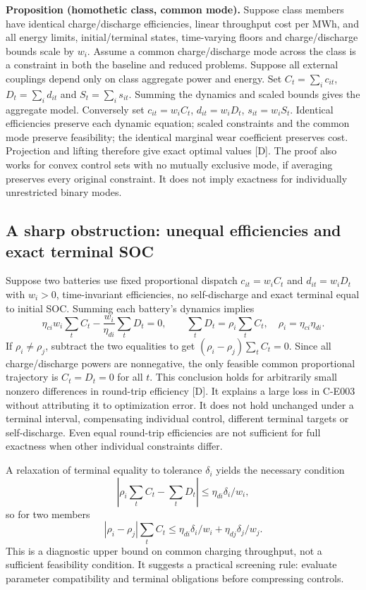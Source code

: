 \documentclass[11pt,letterpaper]{article}
\begin{document}
\textbf{Proposition (homothetic class, common mode).} Suppose class members have identical charge/discharge efficiencies, linear throughput cost per MWh, and all energy limits, initial/terminal states, time-varying floors and charge/discharge bounds scale by $w_i$. Assume a common charge/discharge mode across the class is a constraint in both the baseline and reduced problems. Suppose all external couplings depend only on class aggregate power and energy. Set $C_t=\sum_i c_{it}$, $D_t=\sum_i d_{it}$ and $S_t=\sum_i s_{it}$. Summing the dynamics and scaled bounds gives the aggregate model. Conversely set $c_{it}=w_i C_t$, $d_{it}=w_i D_t$, $s_{it}=w_iS_t$. Identical efficiencies preserve each dynamic equation; scaled constraints and the common mode preserve feasibility; the identical marginal wear coefficient preserves cost. Projection and lifting therefore give exact optimal values [D]. The proof also works for convex control sets with no mutually exclusive mode, if averaging preserves every original constraint. It does not imply exactness for individually unrestricted binary modes.

\subsection{A sharp obstruction: unequal efficiencies and exact terminal SOC}
\label{sec:obstruction}
Suppose two batteries use fixed proportional dispatch $c_{it}=w_i C_t$ and $d_{it}=w_i D_t$ with $w_i>0$, time-invariant efficiencies, no self-discharge and exact terminal equal to initial SOC. Summing each battery's dynamics implies
\[
\eta_{ci}w_i\sum_t C_t -\frac{w_i}{\eta_{di}}\sum_t D_t=0,
\qquad
\sum_tD_t=\rho_i\sum_tC_t,\quad \rho_i=\eta_{ci}\eta_{di}.
\]
If $\rho_i\ne\rho_j$, subtract the two equalities to get $(\rho_i-\rho_j)\sum_tC_t=0$. Since all charge/discharge powers are nonnegative, the only feasible common proportional trajectory is $C_t=D_t=0$ for all $t$. This conclusion holds for arbitrarily small nonzero differences in round-trip efficiency [D]. It explains a large loss in C-E003 without attributing it to optimization error. It does not hold unchanged under a terminal interval, compensating individual control, different terminal targets or self-discharge. Even equal round-trip efficiencies are not sufficient for full exactness when other individual constraints differ.

A relaxation of terminal equality to tolerance $\delta_i$ yields the necessary condition
\[
|\rho_i\textstyle\sum_t C_t-\sum_t D_t|\le \eta_{di}\delta_i/w_i,
\]
so for two members
\[
|\rho_i-\rho_j|\sum_tC_t\le\eta_{di}\delta_i/w_i+\eta_{dj}\delta_j/w_j.
\]
This is a diagnostic upper bound on common charging throughput, not a sufficient feasibility condition. It suggests a practical screening rule: evaluate parameter compatibility and terminal obligations before compressing controls.
\end{document}
